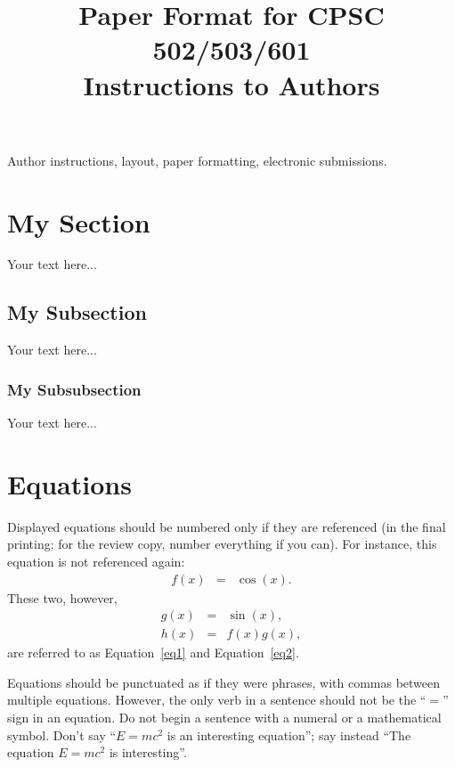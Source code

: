 \documentclass[accepted,single]{gipaper}
\title{Paper Format for CPSC 502/503/601 \\ Instructions to Authors}
\affiliation{
    Department of Computer Science \\
    University of Calgary
}
\begin{document}
\begin{keywords}
Author instructions, layout, paper formatting, electronic submissions.
\end{keywords}


\section{My Section}
\label{mysec}

Your text here...

\subsection{My Subsection}
\label{mysubsec}

Your text here...

\subsubsection{My Subsubsection}

Your text here...



\section{Equations}
\label{equations}

Displayed equations should be numbered only if they are referenced
(in the final printing; for the review copy, number everything if
you can).   For instance, this equation is not referenced again:
\begin{eqnarray*}
    f(x) &=& \cos(x).
\end{eqnarray*}
These two, however,
\begin{eqnarray}
    g(x) &=& \sin(x),    \label{eq1}
    \\
    h(x) &=& f(x) g(x),  \label{eq2}
\end{eqnarray}
are referred to as Equation~\ref{eq1} and Equation~\ref{eq2}.

Equations should be punctuated as if they were phrases, with
commas between multiple equations. However, the only verb in a
sentence should not be the ``$=$'' sign in an equation.   Do not
begin a sentence with a numeral or a mathematical symbol.   Don't
say ``$E=mc^2$ is an interesting equation''; say instead ``The
equation $E=mc^2$ is interesting''.
\end{document}
